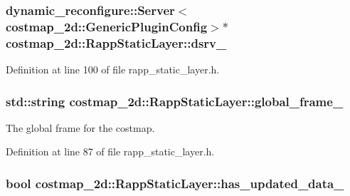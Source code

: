 \hypertarget{classcostmap__2d_1_1RappStaticLayer_a81284848f241f743f0ade2d9253157f8}{
\subsubsection[{dsrv\-\_\-}]{\setlength{\rightskip}{0pt plus 5cm}dynamic\-\_\-reconfigure\-::\-Server$<$costmap\-\_\-2d\-::\-Generic\-Plugin\-Config$>$$\ast$ costmap\-\_\-2d\-::\-Rapp\-Static\-Layer\-::dsrv\-\_\-\hspace{0.3cm}{\ttfamily [private]}}}\label{classcostmap__2d_1_1RappStaticLayer_a81284848f241f743f0ade2d9253157f8}


Definition at line 100 of file rapp\-\_\-static\-\_\-layer.\-h.

\hypertarget{classcostmap__2d_1_1RappStaticLayer_a30e8c9d0097e7cbcc22fa4f8ab60d896}{
\subsubsection[{global\-\_\-frame\-\_\-}]{\setlength{\rightskip}{0pt plus 5cm}std\-::string costmap\-\_\-2d\-::\-Rapp\-Static\-Layer\-::global\-\_\-frame\-\_\-\hspace{0.3cm}{\ttfamily [private]}}}\label{classcostmap__2d_1_1RappStaticLayer_a30e8c9d0097e7cbcc22fa4f8ab60d896}


The global frame for the costmap. 



Definition at line 87 of file rapp\-\_\-static\-\_\-layer.\-h.

\hypertarget{classcostmap__2d_1_1RappStaticLayer_a7e1b829620b5d72827c398279d0cacee}{
\subsubsection[{has\-\_\-updated\-\_\-data\-\_\-}]{\setlength{\rightskip}{0pt plus 5cm}bool costmap\-\_\-2d\-::\-Rapp\-Static\-Layer\-::has\-\_\-updated\-\_\-data\-\_\-\hspace{0.3cm}{\ttfamily [private]}}}\label{classcostmap__2d_1_1RappStaticLayer_a7e1b829620b5d72827c398279d0cacee}


